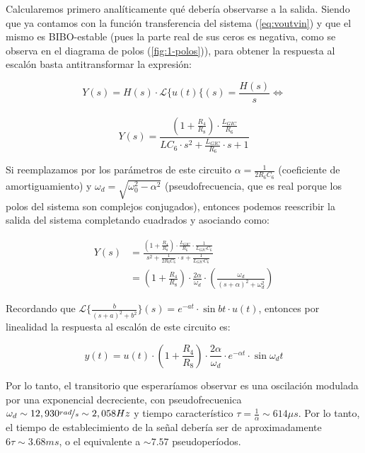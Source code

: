 \documentclass[../../tc_tp3_main.tex]{subfiles}
\begin{document}
Calcularemos primero anal\'iticamente qu\'e deber\'ia observarse a la salida. Siendo que ya contamos con la funci\'on transferencia del sistema (\ref{eq:voutvin}) y que el mismo es BIBO-estable (pues la parte real de sus ceros es negativa, como se observa en el diagrama de polos (\ref{fig:1-polos})), para obtener la respuesta al escal\'on basta antitransformar la expresi\'on:

\[	Y(s) = H(s) \cdot \mathcal{L}\{u(t)\{(s) = \frac{H(s)}{s} \Leftrightarrow\]\\
\[	Y(s) =  \frac{\left( 1+\frac{R_4}{R_8} \right) \cdot \frac{L_{GIC}}{R_6}}{ LC_6 \cdot s^2  + \frac{L_{GIC}}{R_6} \cdot s + 1} \]

Si reemplazamos por los par\'ametros de este circuito $\alpha = \frac{1}{2R_6 C_6}$ (coeficiente de amortiguamiento) y $\omega_d = \sqrt{\omega_0^2 - \alpha^2}$ (pseudofrecuencia, que es real porque los polos del sistema son complejos conjugados), entonces podemos reescribir la salida del sistema completando cuadrados y asociando como:\par

\[
	\begin{aligned} 
	Y(s) &= \frac{ \left( 1+\frac{R_4}{R_8} \right) \cdot \frac{L_{GIC}}{R_6} \cdot \frac{1}{L_{GIC}C_6} }{s^2  + \frac{1}{2R_6 C_6} \cdot s + \frac{1}{L_{GIC}C_6}} \\
	 &= \left( 1+\frac{R_4}{R_8} \right) \cdot \frac{2\alpha}{\omega_d} \cdot \left( \frac{\omega_d}{(s+\alpha)^2 + \omega_d^2} \right)
	 \end{aligned}
\]

Recordando que $\mathcal{L}\{ \frac{b}{(s+a)^2+b^2} \}(s) = e^{-at}\cdot \sin{bt} \cdot u(t)$, entonces por linealidad la respuesta al escal\'on de este circuito es:

\begin{equation}
	y(t) = u(t) \cdot \left(1+\frac{R_4}{R_8} \right) \cdot \frac{2\alpha}{\omega_d} \cdot e^{-\alpha t}\cdot \sin{\omega_d t}
\end{equation} 

Por lo tanto, el transitorio que esperar\'iamos observar es una oscilaci\'on modulada por una exponencial decreciente, con pseudofrecuenica $\omega_d \sim 12,930 \nicefrac{rad}{s} \sim 2,058Hz$ y tiempo caracter\'istico $\tau = \frac{1}{\alpha} \sim 614\mu s$. Por lo tanto, el tiempo de establecimiento de la se\~nal deber\'ia ser de aproximadamente $6\tau \sim 3.68ms$, o el equivalente a $\sim 7.57$ pseudoper\'iodos.
\end{document}
